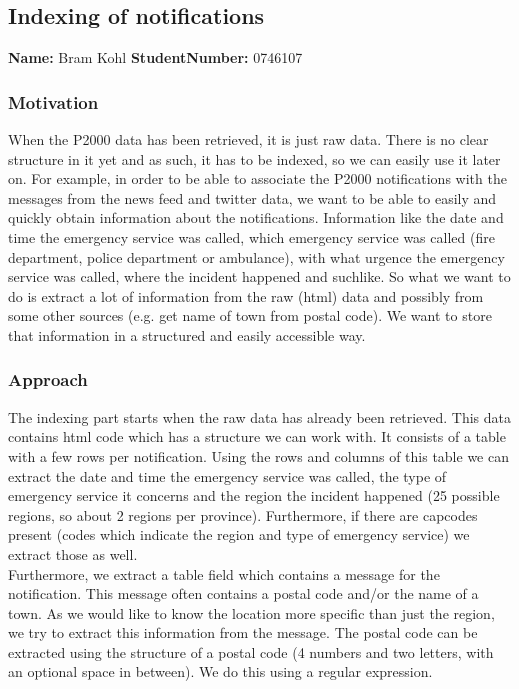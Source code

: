 \subsection{Indexing of notifications}
\textbf{Name:} Bram Kohl \indent \textbf{StudentNumber:} 0746107

\subsubsection*{Motivation}
When the P2000 data has been retrieved, it is just raw data. There is no clear structure in it yet and as such, it has to be indexed, so we can easily use it later on. For example, in order to be able to associate the P2000 notifications with the messages from the news feed and twitter data, we want to be able to easily and quickly obtain information about the notifications. Information like the date and time the emergency service was called, which emergency service was called (fire department, police department or ambulance), with what urgence the emergency service was called, where the incident happened and suchlike. So what we want to do is extract a lot of information from the raw (html) data and possibly from some other sources (e.g. get name of town from postal code). We want to store that information in a structured and easily accessible way.
\subsubsection*{Approach}
The indexing part starts when the raw data has already been retrieved. This data contains html code which has a structure we can work with. It consists of a table with a few rows per notification. Using the rows and columns of this table we can extract the date and time the emergency service was called, the type of emergency service it concerns and the region the incident happened (25 possible regions, so about 2 regions per province). Furthermore, if there are capcodes present (codes which indicate the region and type of emergency service) we extract those as well.\\

Furthermore, we extract a table field which contains a message for the notification. This message often contains a postal code and/or the name of a town. As we would like to know the location more specific than just the region, we try to extract this information from the message.
The postal code can be extracted using the structure of a postal code (4 numbers and two letters, with an optional space in between). We do this using a regular expression.\\

